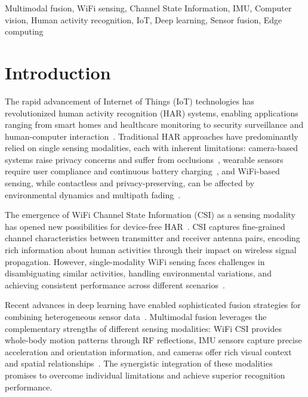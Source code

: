 \documentclass[journal]{IEEEtran}
\begin{document}
\begin{IEEEkeywords}
Multimodal fusion, WiFi sensing, Channel State Information, IMU, Computer vision, Human activity recognition, IoT, Deep learning, Sensor fusion, Edge computing
\end{IEEEkeywords}

\section{Introduction}

The rapid advancement of Internet of Things (IoT) technologies has revolutionized human activity recognition (HAR) systems, enabling applications ranging from smart homes and healthcare monitoring to security surveillance and human-computer interaction~\cite{iotj2023multimodal, tmc2024fusion}. Traditional HAR approaches have predominantly relied on single sensing modalities, each with inherent limitations: camera-based systems raise privacy concerns and suffer from occlusions~\cite{cvpr2023privacy}, wearable sensors require user compliance and continuous battery charging~\cite{sensors2023wearable}, and WiFi-based sensing, while contactless and privacy-preserving, can be affected by environmental dynamics and multipath fading~\cite{mobicom2023wifi}.

The emergence of WiFi Channel State Information (CSI) as a sensing modality has opened new possibilities for device-free HAR~\cite{sensefi2023, efficientfi2022}. CSI captures fine-grained channel characteristics between transmitter and receiver antenna pairs, encoding rich information about human activities through their impact on wireless signal propagation. However, single-modality WiFi sensing faces challenges in disambiguating similar activities, handling environmental variations, and achieving consistent performance across different scenarios~\cite{rewis2022, airfi2022}.

Recent advances in deep learning have enabled sophisticated fusion strategies for combining heterogeneous sensor data~\cite{fusion2024deep}. Multimodal fusion leverages the complementary strengths of different sensing modalities: WiFi CSI provides whole-body motion patterns through RF reflections, IMU sensors capture precise acceleration and orientation information, and cameras offer rich visual context and spatial relationships~\cite{fusionDHL2021, visionaided2022}. The synergistic integration of these modalities promises to overcome individual limitations and achieve superior recognition performance.
\end{document}
